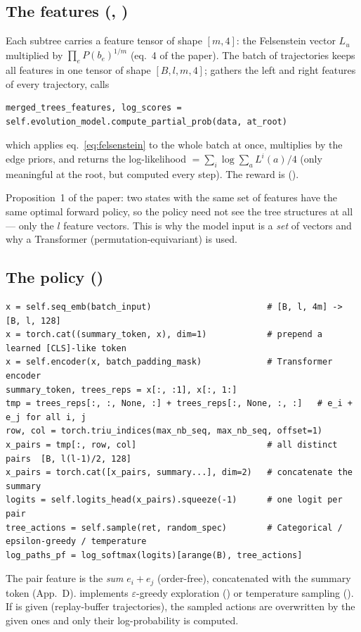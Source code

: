 \subsection{The features (, )}
Each subtree carries a feature tensor of shape $[m,4]$: the Felsenstein vector $L_u$ multiplied by $\prod_e P(b_e)^{1/m}$ (eq.~4 of the paper). The batch of trajectories keeps all features in one tensor  of shape $[B,l,m,4]$;  gathers the left and right features of every trajectory, calls
\begin{lstlisting}
merged_trees_features, log_scores = self.evolution_model.compute_partial_prob(data, at_root)
\end{lstlisting}
which applies eq.~\eqref{eq:felsenstein} to the whole batch at once, multiplies by the edge priors, and returns the log-likelihood  $=\sum_i\log\sum_a L^i(a)/4$ (only meaningful at the root, but computed every step). The reward is  ().

\begin{whybox}
Proposition~1 of the paper: two states with the same set of features have the same optimal forward policy, so the policy need not see the tree structures at all --- only the $l$ feature vectors. This is why the model input is a \emph{set} of vectors and why a Transformer (permutation-equivariant) is used.
\end{whybox}

\subsection{The policy ()}
\begin{lstlisting}
x = self.seq_emb(batch_input)                       # [B, l, 4m] -> [B, l, 128]
x = torch.cat((summary_token, x), dim=1)            # prepend a learned [CLS]-like token
x = self.encoder(x, batch_padding_mask)             # Transformer encoder
summary_token, trees_reps = x[:, :1], x[:, 1:]
tmp = trees_reps[:, :, None, :] + trees_reps[:, None, :, :]   # e_i + e_j for all i, j
row, col = torch.triu_indices(max_nb_seq, max_nb_seq, offset=1)
x_pairs = tmp[:, row, col]                          # all distinct pairs  [B, l(l-1)/2, 128]
x_pairs = torch.cat([x_pairs, summary...], dim=2)   # concatenate the summary
logits = self.logits_head(x_pairs).squeeze(-1)      # one logit per pair
tree_actions = self.sample(ret, random_spec)        # Categorical / epsilon-greedy / temperature
log_paths_pf = log_softmax(logits)[arange(B), tree_actions]
\end{lstlisting}
The pair feature is the \emph{sum} $e_i+e_j$ (order-free), concatenated with the summary token (App.~D).  implements $\varepsilon$-greedy exploration () or temperature sampling (). If  is given (replay-buffer trajectories), the sampled actions are overwritten by the given ones and only their log-probability is computed.

